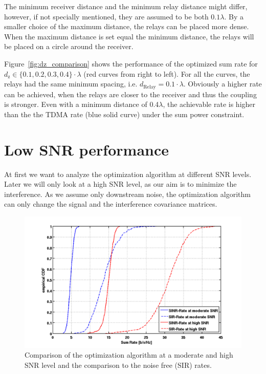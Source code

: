The minimum receiver distance and the minimum relay distance might differ, however, if not specially mentioned, they are assumed to be both $0.1\lambda$.
By a smaller choice of the maximum distance, the relays can be placed more dense.
When the maximum distance is set equal the minimum distance, the relays will be placed on a circle around the receiver.


Figure~\ref{fig:dz_comparison} shows the performance of the optimized sum rate for $d_\text{z}\in\{0.1,0.2,0.3,0.4\}\cdot\lambda$ (red curves from right to left).
For all the curves, the relays had the same minimum spacing, i.e. $d_\text{Relay}=0.1\cdot\lambda$.
Obviously a higher rate can be achieved, when the relays are closer to the receiver and thus the coupling is stronger.
Even with a minimum distance of 0.4$\lambda$, the achievable rate is higher than the the TDMA rate (blue solid curve) under the sum power constraint.

\section{Low SNR performance}
\label{sec:low_snr}

At first we want to analyze the optimization algorithm at different SNR levels.
Later we will only look at a high SNR level, as our aim is to minimize the interference.
As we assume only downstream noise, the optimization algorithm can only change the signal and the interference covariance matrices.
\begin{figure}[h]
\centering
  \includegraphics[width=0.9\linewidth]{images/Comparison_modvshighSNR.png}
\caption{Comparison of the optimization algorithm at a moderate and high SNR level and the comparison to the noise free (SIR) rates.}
\label{fig:snrcomparison}
\end{figure}

